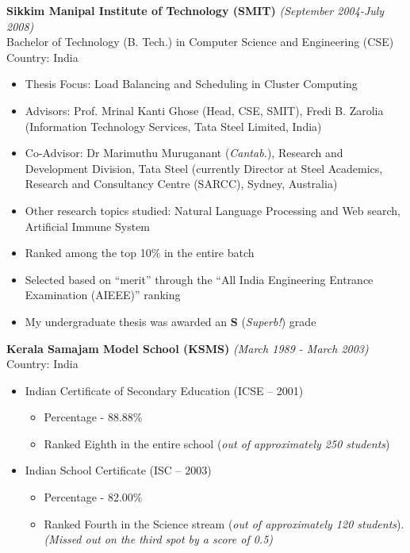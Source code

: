 \documentclass[margin]{res}
\begin{document}
\begin{resume}
 
 {\bf Sikkim Manipal Institute of Technology (SMIT)}  \hfill  \textit{(September 2004-July 2008)}\\
Bachelor of Technology (B. Tech.) in Computer Science and Engineering (CSE)\\
Country: India
\begin{itemize} \itemsep -13pt %
\item Thesis Focus: Load Balancing and Scheduling in Cluster Computing\\
\item Advisors: Prof. Mrinal Kanti Ghose (Head, CSE, SMIT), Fredi B. Zarolia (Information Technology Services, Tata Steel Limited, India) \\
\item Co-Advisor: Dr Marimuthu Muruganant (\textit{Cantab.}), Research and Development Division, Tata Steel (currently Director at Steel Academics, Research and Consultancy Centre (SARCC), Sydney, Australia)\\
\item Other research topics studied: Natural Language Processing and Web search, Artificial Immune System \\
\item Ranked among the top 10\% in the entire batch \\
\item Selected based on ``merit'' through the ``All India Engineering Entrance Examination (AIEEE)'' ranking\\
\item My undergraduate thesis was awarded an \textbf{S} (\textit{Superb!}) grade
\end{itemize}

{\bf Kerala Samajam Model School (KSMS)} \hfill \textit{(March 1989 - March 2003)}\\
Country: India
\begin{itemize}
\item Indian Certificate of Secondary Education (ICSE -- 2001)
\begin{itemize}
\item Percentage - 88.88\%
\item Ranked Eighth in the entire school (\textit{out of approximately 250 students})
\end{itemize}
\item Indian School Certificate (ISC -- 2003)
\begin{itemize}
\item Percentage - 82.00\%
\item Ranked Fourth in the Science stream (\textit{out of approximately 120 students}). \newline \textit{(Missed out on the third spot by a score of 0.5)}
\end{itemize}
\end{itemize}


\end{resume}
\end{document}
